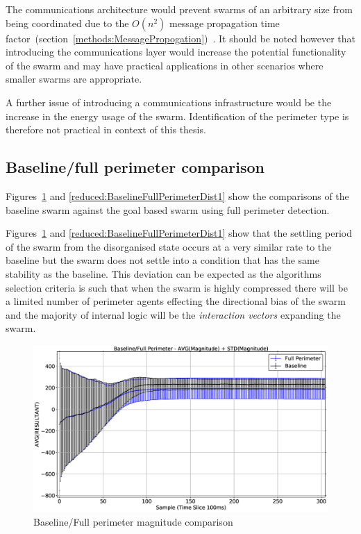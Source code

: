 The communications architecture would prevent swarms of an arbitrary size from being coordinated due to the $O(n^{2})$ message propagation time factor~(section~\ref{methods:MessagePropogation})~\cite{SHA:07}. It should be noted however that introducing the communications layer would increase the potential functionality of the swarm and may have practical applications in other scenarios where smaller swarms are appropriate. 

A further issue of introducing a communications infrastructure would be the increase in the energy usage of the swarm. Identification of the perimeter type is therefore not practical in context of this thesis.

\subsection{Baseline/full perimeter comparison\label{section:compareBaselineFullPerimeter}}
Figures~\ref{reduced:BaselineFullPerimeterMag1} and \ref{reduced:BaselineFullPerimeterDist1} show the comparisons of the baseline swarm against the goal based swarm using full perimeter detection. 

Figures~\ref{reduced:BaselineFullPerimeterMag1} and \ref{reduced:BaselineFullPerimeterDist1} show that the settling period of the swarm from the disorganised state occurs at a very similar rate to the baseline but the swarm does not settle into a condition that has the same stability as the baseline. This deviation can be expected as the algorithms selection criteria is such that when the swarm is highly compressed there will be a limited number of perimeter agents effecting the directional bias of the swarm and the majority of internal logic will be the \textit{interaction vectors} expanding the swarm.

\begin{figure}[H]
\begin{center}
\includegraphics[width=14cm]{CHAPTER-6/figures/BaselineFullPerimeterMag1}
\end{center}
\caption{Baseline/Full perimeter magnitude comparison\label{reduced:BaselineFullPerimeterMag1}}
\end{figure}

